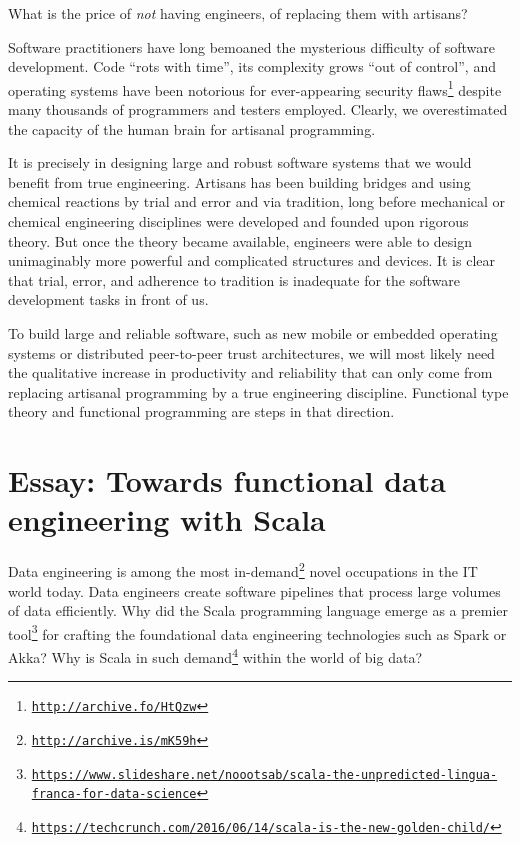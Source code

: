 What is the price of \emph{not} having engineers, of replacing them
with artisans?

Software practitioners have long bemoaned the mysterious difficulty
of software development. Code ``rots with time'', its complexity
grows ``out of control'', and operating systems have been notorious
for ever-appearing security flaws\footnote{\texttt{\href{http://archive.fo/HtQzw}{http://archive.fo/HtQzw}}}
despite many thousands of programmers and testers employed. Clearly,
we overestimated the capacity of the human brain for artisanal programming.

It is precisely in designing large and robust software systems that
we would benefit from true engineering. Artisans has been building
bridges and using chemical reactions by trial and error and via tradition,
long before mechanical or chemical engineering disciplines were developed
and founded upon rigorous theory. But once the theory became available,
engineers were able to design unimaginably more powerful and complicated
structures and devices. It is clear that trial, error, and adherence
to tradition is inadequate for the software development tasks in front
of us. 

To build large and reliable software, such as new mobile or embedded
operating systems or distributed peer-to-peer trust architectures,
we will most likely need the qualitative increase in productivity
and reliability that can only come from replacing artisanal programming
by a true engineering discipline. Functional type theory and functional
programming are steps in that direction.

\chapter{Essay: Towards functional data engineering with Scala}

Data engineering is among the most in-demand\footnote{\texttt{\href{http://archive.is/mK59h}{http://archive.is/mK59h}}}
novel occupations in the IT world today. Data engineers create software
pipelines that process large volumes of data efficiently. Why did
the Scala programming language emerge as a premier tool\footnote{\texttt{\href{https://www.slideshare.net/noootsab/scala-the-unpredicted-lingua-franca-for-data-science}{https://www.slideshare.net/noootsab/scala-the-unpredicted-lingua-franca-for-data-science}}}
for crafting the foundational data engineering technologies such as
Spark or Akka? Why is Scala in such demand\footnote{\texttt{\href{https://techcrunch.com/2016/06/14/scala-is-the-new-golden-child/}{https://techcrunch.com/2016/06/14/scala-is-the-new-golden-child/}}}
within the world of big data?

